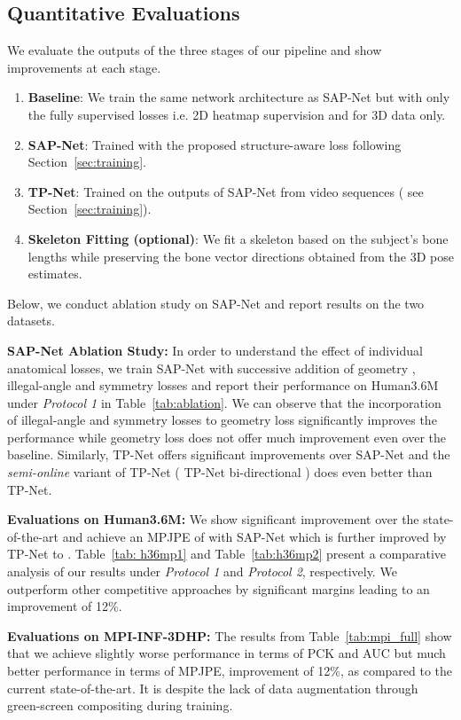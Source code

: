 \documentclass[runningheads]{llncs}
\begin{document}
\subsection{Quantitative Evaluations} \label{quanteval}
We evaluate the outputs of the three stages of our pipeline and show improvements at each stage.
\begin{enumerate}
    \item {\bf Baseline}: We train the same network architecture as SAP-Net but with only the fully supervised losses i.e. 2D heatmap supervision and  for 3D data only. 
    \item  {\bf SAP-Net}: Trained with the proposed structure-aware loss following Section~\ref{sec:training}.
    \item {\bf TP-Net}: Trained on the outputs of SAP-Net from video sequences ( see Section~\ref{sec:training}).
    \item {\bf Skeleton Fitting (optional)}: We fit a skeleton based on the subject's bone lengths while preserving the bone vector directions obtained from the 3D pose estimates.
\end{enumerate}
Below, we conduct ablation study on SAP-Net and report results on the two datasets.

\textbf{SAP-Net Ablation Study:} In order to understand the effect of individual anatomical losses, we train SAP-Net with successive addition of geometry , illegal-angle  and symmetry  losses and report their performance on Human3.6M under {\it Protocol 1} in Table~\ref{tab:ablation}. We can observe that the incorporation of illegal-angle and symmetry losses to geometry loss significantly improves the performance while geometry loss does not offer much improvement even over the baseline. Similarly, TP-Net offers significant improvements over SAP-Net and the \emph{semi-online} variant of TP-Net ( TP-Net bi-directional ) does even better than TP-Net.

\textbf{Evaluations on Human3.6M:}
We show significant improvement over the state-of-the-art and achieve an MPJPE of  with SAP-Net which is further improved by TP-Net to . Table~\ref{tab: h36mp1} and Table~\ref{tab:h36mp2} present a comparative analysis of our results under \textit{Protocol 1} and \textit{Protocol 2}, respectively. We outperform other competitive approaches by significant margins leading to an improvement of 12\%. 

\textbf{Evaluations on MPI-INF-3DHP:}
The results from Table~\ref{tab:mpi_full} show that we achieve slightly worse performance in terms of PCK and AUC but much better performance in terms of MPJPE, improvement of 12\%, as compared to the current state-of-the-art. It is despite the lack of data augmentation through green-screen compositing during training. 
\end{document}
